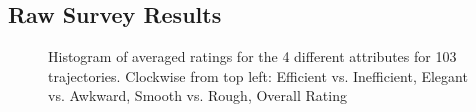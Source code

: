 \documentclass[letterpaper, 10 pt, conference]{ieeeconf}  %
\begin{document}
\subsection{Raw Survey Results}
\begin{figure}[h]
  \caption{Histogram of averaged ratings for the 4 different attributes for 103 trajectories. Clockwise from top left: Efficient vs. Inefficient, Elegant vs. Awkward, Smooth vs. Rough, Overall Rating}
\label{fig:survey_raw}
\end{figure}
\end{document}
